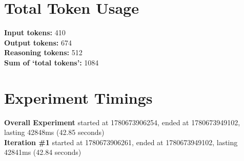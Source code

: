 \documentclass{article}
\begin{document}
\section*{Total Token Usage}
\textbf{Input tokens: }410
\\\textbf{Output tokens: }674
\\\textbf{Reasoning tokens: }512
\\\textbf{Sum of `total tokens': }1084
\section*{Experiment Timings}
\textbf{Overall Experiment} started at 1780673906254, ended at 1780673949102, lasting 42848ms (42.85 seconds)
\\\textbf{Iteration \#1} started at 1780673906261, ended at 1780673949102, lasting 42841ms (42.84 seconds)
\end{document}
